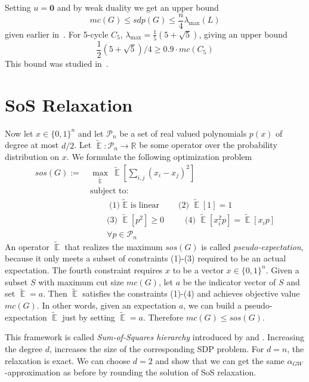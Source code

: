 \documentclass[twoside,leqno,twocolumn]{article}
\newcommand{\vect}[1]{\boldsymbol{#1}}
\DeclareMathOperator{\Ex}{\mathbb{E}}
\begin{document}
Setting $u = \vect{0}$ and by weak duality we get an upper bound
\begin{equation*}
mc(G) \leq sdp(G) \leq \frac{n}{4} \lambda_{\max}(L)
\end{equation*}
given earlier in~\cite{MP90}. For 5-cycle $C_{5}$, $\lambda_{\max} = \frac{1}{5}(5 + \sqrt{5})$, giving an upper bound
\begin{equation*}
\frac{1}{2}(5 + \sqrt{5})/4 \geq 0.9 \cdot mc(C_{5})
\end{equation*}
This bound was studied in~\cite{DP93}.

\section{SoS Relaxation} 
Now let $x \in \lbrace 0, 1 \rbrace^{n}$ and let $\mathcal{P}_{n}$ be a set of real valued polynomials $p(x)$ of degree at most $d/2$. Let $\tilde{\Ex}: \mathcal{P}_{n} \rightarrow \mathbb{R}$ be some operator over the probability distribution on $x$. We formulate the following optimization problem 
\begin{align*}
sos(G) := \ & \max_{\tilde{\Ex}} \ \tilde{\Ex}[ \sum_{i, j} (x_{i} - x_{j})^{2} ] \nonumber\\
& \text{subject to: } \\[.4em]
& \qquad \text{(1) $\tilde{\Ex}$ is linear} \qquad \text{(2) $\tilde{\Ex}[1] = 1$} \\[.4em]
& \qquad \text{(3) $\tilde{\Ex}[p^2] \geq 0$} \qquad \, \, \, \text{(4) $\tilde{\Ex}[x_{i}^{2}p] = \tilde{\Ex}[x_{i}p]$} \\[.4em]
& \qquad \forall p \in \mathcal{P}_{n}
\end{align*}
An operator $\tilde{\Ex}$ that realizes the maximum $sos(G)$ is called {\it pseudo-expectation}, because it only meets a subset of constraints (1)-(3) required to be an actual expectation. The fourth constraint requires $x$ to be a vector $x \in \lbrace 0, 1 \rbrace^{n}$. Given a subset $S$ with maximum cut size $mc(G)$, let $a$ be the indicator vector of $S$ and set $\tilde{\Ex} = a$. Then $\tilde{\Ex}$ satisfies the constraints (1)-(4) and achieves objective value $mc(G)$. In other words, given an expectation $a$, we can build a pseudo-expectation $\tilde{\Ex}$ just by setting $\tilde{\Ex} = a$. Therefore $mc(G) \leq sos(G)$.

This framework is called {\it Sum-of-Squares hierarchy} introduced by \cite{Parillo00} and \cite{Lasserre01}. Increasing the degree $d$, increases the size of the corresponding SDP problem. For $d = n$, the relaxation is exact. We can choose $d=2$ and show that we can get the same $\alpha_{GW}$-approximation as before by rounding the solution of SoS relaxation.
\end{document}

